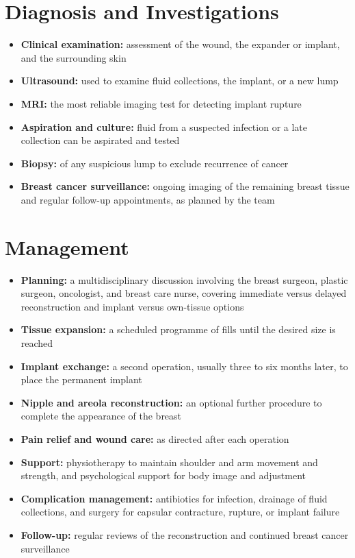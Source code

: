 \section*{Diagnosis and Investigations}
\begin{itemize}
    \item \textbf{Clinical examination:} assessment of the wound, the expander or implant, and the surrounding skin
    \item \textbf{Ultrasound:} used to examine fluid collections, the implant, or a new lump
    \item \textbf{MRI:} the most reliable imaging test for detecting implant rupture
    \item \textbf{Aspiration and culture:} fluid from a suspected infection or a late collection can be aspirated and tested
    \item \textbf{Biopsy:} of any suspicious lump to exclude recurrence of cancer
    \item \textbf{Breast cancer surveillance:} ongoing imaging of the remaining breast tissue and regular follow-up appointments, as planned by the team
\end{itemize}

\section*{Management}
\begin{itemize}
    \item \textbf{Planning:} a multidisciplinary discussion involving the breast surgeon, plastic surgeon, oncologist, and breast care nurse, covering immediate versus delayed reconstruction and implant versus own-tissue options
    \item \textbf{Tissue expansion:} a scheduled programme of fills until the desired size is reached
    \item \textbf{Implant exchange:} a second operation, usually three to six months later, to place the permanent implant
    \item \textbf{Nipple and areola reconstruction:} an optional further procedure to complete the appearance of the breast
    \item \textbf{Pain relief and wound care:} as directed after each operation
    \item \textbf{Support:} physiotherapy to maintain shoulder and arm movement and strength, and psychological support for body image and adjustment
    \item \textbf{Complication management:} antibiotics for infection, drainage of fluid collections, and surgery for capsular contracture, rupture, or implant failure
    \item \textbf{Follow-up:} regular reviews of the reconstruction and continued breast cancer surveillance
\end{itemize}

